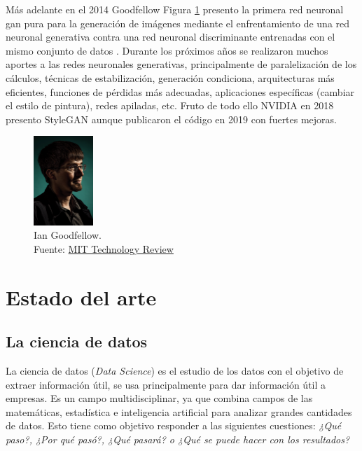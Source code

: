 Más adelante en el 2014 {Goodfellow} Figura \ref{fig:gan-ian-goodfellow} presento la primera red neuronal \acrshort{gan} pura para la generación de imágenes mediante el enfrentamiento de una red neuronal generativa contra una red neuronal discriminante entrenadas con el mismo conjunto de datos \cite{goodfellow2014generative}.
Durante los próximos años se realizaron muchos aportes a las redes neuronales generativas, principalmente de paralelización de los cálculos, técnicas de estabilización, generación condiciona, arquitecturas más eficientes, funciones de pérdidas más adecuadas, aplicaciones específicas (cambiar el estilo de pintura), redes apiladas, etc.
Fruto de todo ello {NVIDIA} en 2018 presento \gls{StyleGAN} \cite{karras2019stylebased} aunque publicaron el código en 2019 con fuertes mejoras.

\begin{figure}[H]
    \centering
    \includegraphics[width=0.2\textwidth]{figures/gan-goodfellow.png}
    \caption{Ian Goodfellow.\\Fuente: \href{https://www.technologyreview.es/s/10016/el-senor-de-las-gan-el-hombre-que-dio-imaginacion-las-maquinas}{MIT Technology Review}}
    \label{fig:gan-ian-goodfellow}
\end{figure}


\section{Estado del arte}
\label{ch:2:section:state-of-the-art}

\subsection{La ciencia de datos}
La ciencia de datos (\textit{Data Science}) es el estudio de los datos con el objetivo de extraer información útil, se usa principalmente para dar información útil a empresas. Es un campo multidisciplinar, ya que combina campos de las matemáticas, estadística e inteligencia artificial para analizar grandes cantidades de datos. Esto tiene como objetivo responder a las siguientes cuestiones: \textit{¿Qué paso?, ¿Por qué pasó?, ¿Qué pasará? o ¿Qué se puede hacer con los resultados?} \cite{aws-data-science}

